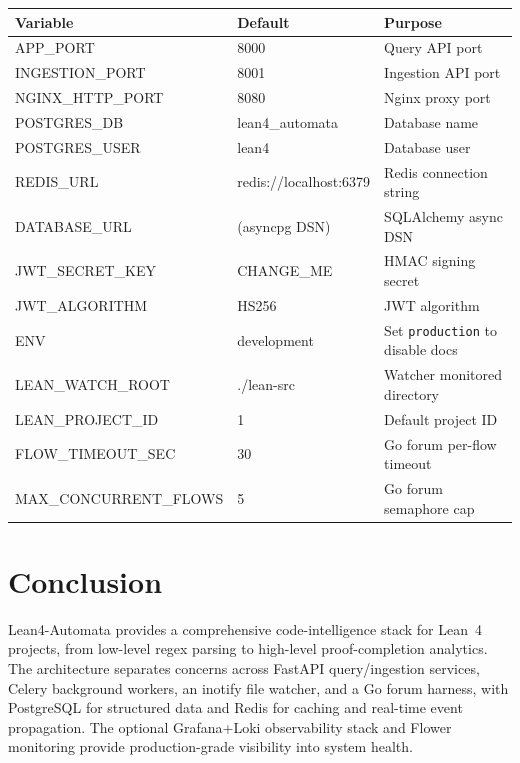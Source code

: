 \documentclass[11pt,a4paper]{article}
\begin{document}
\begin{longtable}{@{}llp{6cm}@{}}
\toprule
\textbf{Variable} & \textbf{Default} & \textbf{Purpose} \\
\midrule
\endhead
APP\_PORT           & 8000                 & Query API port \\
INGESTION\_PORT     & 8001                 & Ingestion API port \\
NGINX\_HTTP\_PORT   & 8080                 & Nginx proxy port \\
POSTGRES\_DB        & lean4\_automata      & Database name \\
POSTGRES\_USER      & lean4                & Database user \\
REDIS\_URL          & redis://localhost:6379 & Redis connection string \\
DATABASE\_URL       & (asyncpg DSN)        & SQLAlchemy async DSN \\
JWT\_SECRET\_KEY    & CHANGE\_ME           & HMAC signing secret \\
JWT\_ALGORITHM      & HS256                & JWT algorithm \\
ENV                 & development          & Set \texttt{production} to disable docs \\
LEAN\_WATCH\_ROOT   & ./lean-src           & Watcher monitored directory \\
LEAN\_PROJECT\_ID   & 1                    & Default project ID \\
FLOW\_TIMEOUT\_SEC  & 30                   & Go forum per-flow timeout \\
MAX\_CONCURRENT\_FLOWS & 5                 & Go forum semaphore cap \\
\bottomrule
\end{longtable}

\section{Conclusion}

Lean4-Automata provides a comprehensive code-intelligence stack for Lean~4
projects, from low-level regex parsing to high-level proof-completion analytics.
The architecture separates concerns across FastAPI query/ingestion services,
Celery background workers, an inotify file watcher, and a Go forum harness,
with PostgreSQL for structured data and Redis for caching and real-time
event propagation. The optional Grafana+Loki observability stack and
Flower monitoring provide production-grade visibility into system health.
\end{document}
